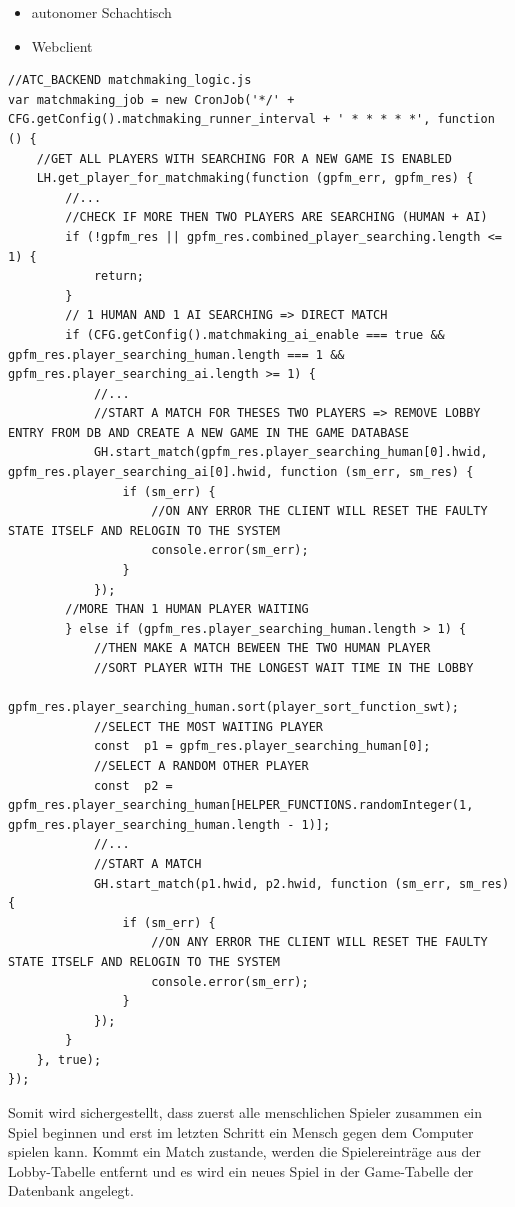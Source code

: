 \begin{itemize}
\tightlist
\item
  autonomer Schachtisch
\item
  Webclient
\end{itemize}

\begin{lstlisting}
//ATC_BACKEND matchmaking_logic.js
var matchmaking_job = new CronJob('*/' + CFG.getConfig().matchmaking_runner_interval + ' * * * * *', function () {
    //GET ALL PLAYERS WITH SEARCHING FOR A NEW GAME IS ENABLED
    LH.get_player_for_matchmaking(function (gpfm_err, gpfm_res) {
        //...
        //CHECK IF MORE THEN TWO PLAYERS ARE SEARCHING (HUMAN + AI)
        if (!gpfm_res || gpfm_res.combined_player_searching.length <= 1) {
            return;
        }
        // 1 HUMAN AND 1 AI SEARCHING => DIRECT MATCH
        if (CFG.getConfig().matchmaking_ai_enable === true && gpfm_res.player_searching_human.length === 1 && gpfm_res.player_searching_ai.length >= 1) {
            //...
            //START A MATCH FOR THESES TWO PLAYERS => REMOVE LOBBY ENTRY FROM DB AND CREATE A NEW GAME IN THE GAME DATABASE
            GH.start_match(gpfm_res.player_searching_human[0].hwid, gpfm_res.player_searching_ai[0].hwid, function (sm_err, sm_res) {
                if (sm_err) {
                    //ON ANY ERROR THE CLIENT WILL RESET THE FAULTY STATE ITSELF AND RELOGIN TO THE SYSTEM
                    console.error(sm_err);
                }
            });
        //MORE THAN 1 HUMAN PLAYER WAITING
        } else if (gpfm_res.player_searching_human.length > 1) {
            //THEN MAKE A MATCH BEWEEN THE TWO HUMAN PLAYER
            //SORT PLAYER WITH THE LONGEST WAIT TIME IN THE LOBBY
            gpfm_res.player_searching_human.sort(player_sort_function_swt);
            //SELECT THE MOST WAITING PLAYER
            const  p1 = gpfm_res.player_searching_human[0];
            //SELECT A RANDOM OTHER PLAYER
            const  p2 = gpfm_res.player_searching_human[HELPER_FUNCTIONS.randomInteger(1, gpfm_res.player_searching_human.length - 1)];
            //...
            //START A MATCH
            GH.start_match(p1.hwid, p2.hwid, function (sm_err, sm_res) {
                if (sm_err) {
                    //ON ANY ERROR THE CLIENT WILL RESET THE FAULTY STATE ITSELF AND RELOGIN TO THE SYSTEM
                    console.error(sm_err);
                }
            });
        }
    }, true);
});
\end{lstlisting}

Somit wird sichergestellt, dass zuerst alle menschlichen Spieler
zusammen ein Spiel beginnen und erst im letzten Schritt ein Mensch gegen
dem Computer spielen kann. Kommt ein Match zustande, werden die
Spielereinträge aus der Lobby-Tabelle entfernt und es wird ein neues
Spiel in der Game-Tabelle der Datenbank angelegt.

